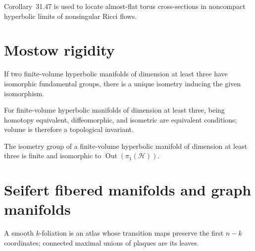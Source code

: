 \begin{remark}
\label{rem:chow-iv-small-tori-application}

Corollary~31.47 is used to locate almost-flat torus cross-sections in noncompact
hyperbolic limits of nonsingular Ricci flows.
\end{remark}

\section{Mostow rigidity}

\begin{theorem}
\label{thm:chow-iv-mostow-rigidity}

If two finite-volume hyperbolic manifolds of dimension at least three have
isomorphic fundamental groups, there is a unique isometry inducing the given
isomorphism.
\end{theorem}

\begin{corollary}
\label{cor:chow-iv-mostow-equivalences}


For finite-volume hyperbolic manifolds of dimension at least three, being
homotopy equivalent, diffeomorphic, and isometric are equivalent conditions;
volume is therefore a topological invariant.
\end{corollary}

\begin{corollary}
\label{cor:chow-iv-isometry-group}


The isometry group of a finite-volume hyperbolic manifold of dimension at least
three is finite and isomorphic to \(\operatorname{Out}(\pi_1(\mathcal H))\).
\end{corollary}

\section{Seifert fibered manifolds and graph manifolds}

\begin{definition}[Foliation]
\label{def:chow-iv-foliation}

A smooth \(k\)-foliation is an atlas whose transition maps preserve the first
\(n-k\) coordinates; connected maximal unions of plaques are its leaves.
\end{definition}

